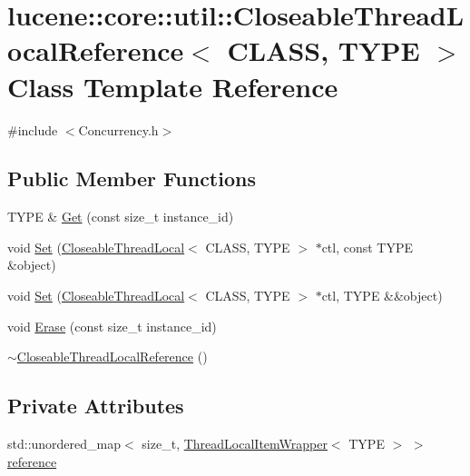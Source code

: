 \hypertarget{classlucene_1_1core_1_1util_1_1CloseableThreadLocalReference}{}\section{lucene\+:\+:core\+:\+:util\+:\+:Closeable\+Thread\+Local\+Reference$<$ C\+L\+A\+SS, T\+Y\+PE $>$ Class Template Reference}
\label{classlucene_1_1core_1_1util_1_1CloseableThreadLocalReference}


{\ttfamily \#include $<$Concurrency.\+h$>$}

\subsection*{Public Member Functions}
\begin{DoxyCompactItemize}
\item 
T\+Y\+PE \& \mbox{\hyperlink{classlucene_1_1core_1_1util_1_1CloseableThreadLocalReference_a3cb386298ca2b0b974705f591b313891}{Get}} (const size\+\_\+t instance\+\_\+id)
\item 
void \mbox{\hyperlink{classlucene_1_1core_1_1util_1_1CloseableThreadLocalReference_a0492bd60f1e06eef9e03020d97bb7c91}{Set}} (\mbox{\hyperlink{classlucene_1_1core_1_1util_1_1CloseableThreadLocal}{Closeable\+Thread\+Local}}$<$ C\+L\+A\+SS, T\+Y\+PE $>$ $\ast$ctl, const T\+Y\+PE \&object)
\item 
void \mbox{\hyperlink{classlucene_1_1core_1_1util_1_1CloseableThreadLocalReference_a2a565539a30bc0a9cac563262989775f}{Set}} (\mbox{\hyperlink{classlucene_1_1core_1_1util_1_1CloseableThreadLocal}{Closeable\+Thread\+Local}}$<$ C\+L\+A\+SS, T\+Y\+PE $>$ $\ast$ctl, T\+Y\+PE \&\&object)
\item 
void \mbox{\hyperlink{classlucene_1_1core_1_1util_1_1CloseableThreadLocalReference_a7f6be51394814fe98af69803fd978359}{Erase}} (const size\+\_\+t instance\+\_\+id)
\item 
\mbox{\hyperlink{classlucene_1_1core_1_1util_1_1CloseableThreadLocalReference_a4088bd7d403b38fea1399bd592a6c73e}{$\sim$\+Closeable\+Thread\+Local\+Reference}} ()
\end{DoxyCompactItemize}
\subsection*{Private Attributes}
\begin{DoxyCompactItemize}
\item 
std\+::unordered\+\_\+map$<$ size\+\_\+t, \mbox{\hyperlink{classlucene_1_1core_1_1util_1_1ThreadLocalItemWrapper}{Thread\+Local\+Item\+Wrapper}}$<$ T\+Y\+PE $>$ $>$ \mbox{\hyperlink{classlucene_1_1core_1_1util_1_1CloseableThreadLocalReference_a1df112eff02d74eb49b69c548c197a5f}{reference}}
\end{DoxyCompactItemize}


